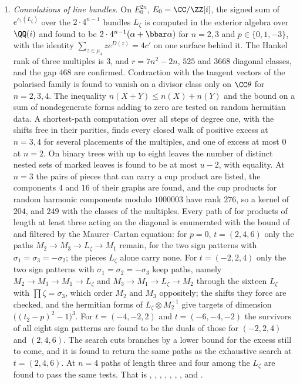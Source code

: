 \begin{enumerate}[label=\textup{(\Roman*)},leftmargin=*]
\item \emph{Convolutions of line bundles.} On $E_{0}^{2n}$, $E_{0}=\CC/\ZZ[i]$,
  the signed sum of $e^{c_{1}(L_{\zeta})}$ over the $2\cdot4^{n-1}$ bundles
  $L_{\zeta}$ is computed in the exterior algebra over $\QQ(i)$ and found to
  be $2\cdot4^{n-1}(\alpha+\bbar\alpha)$ for $n=2,3$ and $p\in\{0,1,-3\}$,
  with the identity $\sum_{z\in\mu_{4}}ze^{D(z)}=4c'$ on one surface behind
  it. The Hankel rank of three multiples is $3$, and $r=7n^{2}-2n$, $525$ and
  $3668$ diagonal classes, and the gap $468$ are confirmed. Contraction with
  the tangent vectors of the polarised family is found to vanish on a divisor
  class only on $\CC\theta$ for $n=2,3,4$. The inequality
  $n(X+Y)\le n(X)+n(Y)$ and the bound on a sum of nondegenerate forms adding
  to zero are tested on random hermitian data. A shortest-path computation
  over all steps of degree one, with the shifts free in their parities, finds
  every closed walk of positive excess at $n=3,4$ for several placements of
  the multiples, and one of excess at most $0$ at $n=2$. On binary trees
  with up to eight leaves the number of distinct nested sets of marked
  leaves is found to be at most $u-2$, with equality. At $n=3$ the pairs of
  pieces that can carry a cup product are listed, the components $4$ and
  $16$ of their graphs are found, and the cup products for random harmonic
  components modulo $1000003$ have rank $276$, so a kernel of $204$, and
  $249$ with the classes of the multiples. Every path of 
  for products of length at least three acting on the diagonal is
  enumerated with the bound of  and filtered by the
  Maurer--Cartan equation: for $p=0$, $t=(2,4,6)$ only the paths
  $M_{2}\to M_{3}\to L_{\zeta}\to M_{1}$ remain, for the two sign patterns
  with $\sigma_{1}=\sigma_{3}=-\sigma_{2}$; the pieces $L_{\zeta}$ alone
  carry none. For $t=(-2,2,4)$ only the two sign patterns with
  $\sigma_{1}=\sigma_{2}=-\sigma_{3}$ keep paths, namely
  $M_{2}\to M_{3}\to M_{1}\to L_{\zeta}$ and
  $M_{3}\to M_{1}\to L_{\zeta}\to M_{2}$ through the sixteen $L_{\zeta}$
  with $\prod\zeta=\sigma_{3}$, which order $M_{2}$ and $M_{3}$ oppositely;
  the shifts they force are checked, and the hermitian forms of
  $L_{\zeta}\otimes M_{2}^{-1}$ give targets of dimension
  $\bigl((t_{2}-p)^{2}-1\bigr)^{3}$. For $t=(-4,-2,2)$ and $t=(-6,-4,-2)$
  the survivors of all eight sign patterns are found to be the duals of
  those for $(-2,2,4)$ and $(2,4,6)$. The search cuts branches by a lower
  bound for the excess still to come, and it is found to return the same
  paths as the exhaustive search at $t=(2,4,6)$. At $n=4$ paths of length
  three and four among the $L_{\zeta}$ are found to pass the same tests.
  That is , ,
  , , ,
  , ,
   and .


\end{enumerate}
